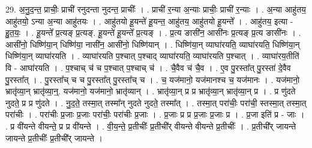 \documentclass[17pt]{extarticle}
\begin{document}
29. अ॒नु॒द॒न्त॒ प्राचीः॒ प्राची॑ रनुदन्ता नुदन्त॒ प्राचीः᳚ । . प्राची॑ र॒न्या अ॒न्याः प्राचीः॒ प्राची॑ र॒न्याः । . अ॒न्या आहु॑तय॒ आहु॑तयो॒ ऽन्या अ॒न्या आहु॑तयः । . आहु॑तयो हू॒यन्ते॑ हू॒यन्त॒ आहु॑तय॒ आहु॑तयो हू॒यन्ते᳚ । . आहु॑तय॒ इत्या - हु॒त॒यः॒ । . हू॒यन्ते᳚ प्र॒त्यङ् प्र॒त्यङ्. हू॒यन्ते॑ हू॒यन्ते᳚ प्र॒त्यङ् । . प्र॒त्य ङासी॑न॒ आसी॑नः प्र॒त्यङ् प्र॒त्य ङासी॑नः । . आसी॑नो॒ धिष्णि॑या॒न् धिष्णि॑या॒ नासी॑न॒ आसी॑नो॒ धिष्णि॑यान् । . धिष्णि॑या॒न् व्याघा॑रयति॒ व्याघा॑रयति॒ धिष्णि॑या॒न् धिष्णि॑या॒न् व्याघा॑रयति । . व्याघा॑रयति प॒श्चात् प॒श्चाद् व्याघा॑रयति॒ व्याघा॑रयति प॒श्चात् । . व्याघा॑रय॒तीति॑ वि - आघा॑रयति । . प॒श्चाच् च॑ च प॒श्चात् प॒श्चाच् च॑ । . चै॒वैव च॑ चै॒व । . ए॒व पु॒रस्ता᳚त् पु॒रस्ता॑ दे॒वैव पु॒रस्ता᳚त् । . पु॒रस्ता᳚च् च च पु॒रस्ता᳚त् पु॒रस्ता᳚च् च । . च॒ यज॑मानो॒ यज॑मानश्च च॒ यज॑मानः । . यज॑मानो॒ भ्रातृ॑व्या॒न् भ्रातृ॑व्या॒न्॒. यज॑मानो॒ यज॑मानो॒ भ्रातृ॑व्यान् । . भ्रातृ॑व्या॒न् प्र प्र भ्रातृ॑व्या॒न् भ्रातृ॑व्या॒न् प्र । . प्र णु॑दते नुदते॒ प्र प्र णु॑दते । . नु॒द॒ते॒ तस्मा॒त् तस्मा᳚न् नुदते नुदते॒ तस्मा᳚त् । . तस्मा॒त् परा॑चीः॒ परा॑ची॒ स्तस्मा॒त् तस्मा॒त् परा॑चीः । . परा॑चीः प्र॒जाः प्र॒जाः परा॑चीः॒ परा॑चीः प्र॒जाः । . प्र॒जाः प्र प्र प्र॒जाः प्र॒जाः प्र । . प्र॒जा इति॑ प्र - जाः । . प्र वी॑यन्ते वीयन्ते॒ प्र प्र वी॑यन्ते । . वी॒य॒न्ते॒ प्र॒तीचीः᳚ प्र॒तीची᳚र् वीयन्ते वीयन्ते प्र॒तीचीः᳚ । . प्र॒तीची᳚र् जायन्ते जायन्ते प्र॒तीचीः᳚ प्र॒तीची᳚र् जायन्ते । \newline
\end{document}
